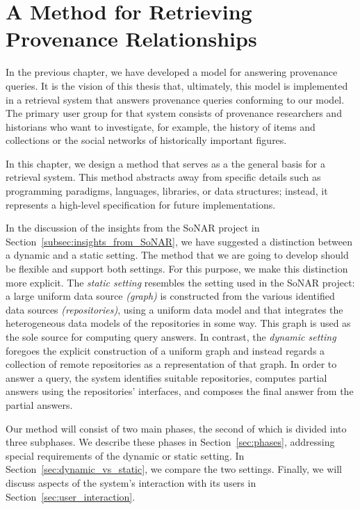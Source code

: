 \chapter{A Method for Retrieving Provenance Relationships}
\label{chap:retrieval}
\label{chap:method}

In the previous chapter, 
we have developed a model for answering provenance queries.
It is the vision of this thesis that, ultimately,
this model is implemented 
in a retrieval system
that answers provenance queries conforming to our model.
The primary user group for that system consists of provenance researchers
and historians who want to investigate, for example, the history of
items and collections or the social networks of historically important figures.

In this chapter, we design a method that serves
as a the general basis for a retrieval system.
This method abstracts away from specific details such as 
programming paradigms, languages, libraries, or data structures;
instead, it represents a high-level specification
for future implementations.

In the discussion of the insights from the \gls{SoNAR} project
in Section~\ref{subsec:insights_from_SoNAR},
we have suggested a distinction between a dynamic and a static setting.
The method that we are going to develop should be flexible
and support both settings.
For this purpose, we make this distinction more explicit.
The \emph{static setting} resembles the setting used in the SoNAR project:
a large uniform data source \emph{(graph)} is constructed
from the various identified data sources \emph{(repositories)},
using a uniform data model and that integrates the heterogeneous data models
of the repositories in some way. This graph is 
used as the sole source for computing query answers.
In contrast, the \emph{dynamic setting} foregoes
the explicit construction of a uniform graph and instead
regards a collection of remote repositories as a representation of that
graph. In order to answer a query, the system identifies
suitable repositories, computes partial answers using the repositories' interfaces,
and composes the final answer from the partial answers.

Our method will consist of two main phases, the second of which is divided
into three subphases.
We describe these phases in Section~\ref{sec:phases},
addressing special requirements of the dynamic or static setting.
In Section~\ref{sec:dynamic_vs_static}, we compare the two settings.
Finally, we will discuss aspects of the system's interaction with its users
in Section~\ref{sec:user_interaction}.

